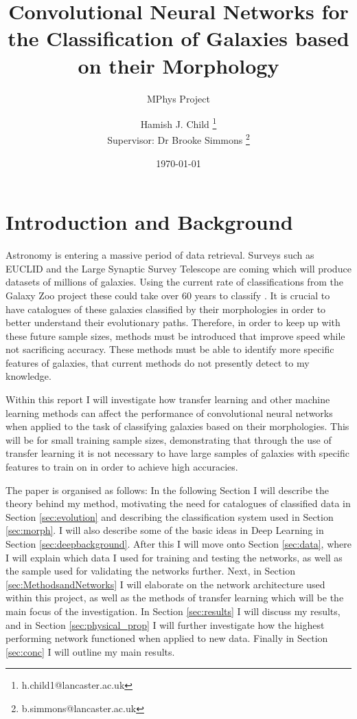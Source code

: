 \documentclass[12pt, onecolumn]{aa}
\subtitle{MPhys Project}
\title{Convolutional Neural Networks for the Classification of Galaxies based on their Morphology}
\author{Hamish J. Child \inst{1} \thanks{h.child1@lancaster.ac.uk}\\
Supervisor: Dr Brooke Simmons \inst{1} \thanks{b.simmons@lancaster.ac.uk}}
\institute{Physics Department, Lancaster University}
\date{\today}
\begin{document}
\maketitle
\newpage
\tableofcontents
\newpage


\section{Introduction and Background}\label{sec:intro}

Astronomy is entering a massive period of data retrieval. Surveys such as EUCLID \citep{2016SPIE.9904E..0OR} and the Large Synaptic Survey Telescope \citep{2019ApJ...873..111I} are coming which will produce datasets of millions of galaxies. Using the current rate of classifications from the Galaxy Zoo project these could take over 60 years to classify \citep{2018MNRAS.476.5516B}. It is crucial to have catalogues of these galaxies classified by their morphologies in order to better understand their evolutionary paths. Therefore, in order to keep up with these future sample sizes, methods must be introduced that improve speed while not sacrificing accuracy. These methods must be able to identify more specific features of galaxies, that current methods do not presently detect to my knowledge.

Within this report I will investigate how transfer learning and other machine learning methods can affect the performance of convolutional neural networks when applied to the task of classifying galaxies based on their morphologies. This will be for small training sample sizes, demonstrating that through the use of transfer learning it is not necessary to have large samples of galaxies with specific features to train on in order to achieve high accuracies. 

The paper is organised as follows: In the following Section I will describe the theory behind my method, motivating the need for catalogues of classified data in Section \ref{sec:evolution} and describing the classification system used in Section \ref{sec:morph}. I will also describe some of the basic ideas in Deep Learning in Section \ref{sec:deepbackground}. After this I will move onto Section \ref{sec:data}, where I will explain which data I used for training and testing the networks, as well as the sample used for validating the networks further. Next, in Section \ref{sec:MethodsandNetworks} I will elaborate on the network architecture used within this project, as well as the methods of transfer learning which will be the main focus of the investigation. In Section \ref{sec:results} I will discuss my results, and in Section \ref{sec:physical_prop} I will further investigate how the highest performing network functioned when applied to new data. Finally in Section \ref{sec:conc} I will outline my main results.
\end{document}
